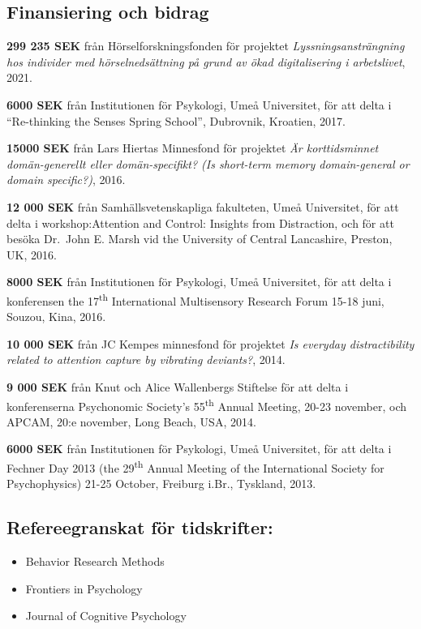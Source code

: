 \documentclass[]{article}
\begin{document}
\hypertarget{finansiering-och-bidrag}{%
\subsection{Finansiering och bidrag}\label{finansiering-och-bidrag}}

\textbf{299 235 SEK} från Hörselforskningsfonden för projektet
\emph{Lyssningsansträngning hos individer med hörselnedsättning på grund
av ökad digitalisering i arbetslivet}, 2021.

\textbf{6000 SEK} från Institutionen för Psykologi, Umeå Universitet,
för att delta i ``Re-thinking the Senses Spring School'', Dubrovnik,
Kroatien, 2017.

\textbf{15000 SEK} från Lars Hiertas Minnesfond för projektet \emph{Är
korttidsminnet domän-generellt eller domän-specifikt? (Is short-term
memory domain-general or domain specific?)}, 2016.

\textbf{12 000 SEK} från Samhällsvetenskapliga fakulteten, Umeå
Universitet, för att delta i workshop:Attention and Control: Insights
from Distraction, och för att besöka Dr.~John E. Marsh vid the
University of Central Lancashire, Preston, UK, 2016.

\textbf{8000 SEK} från Institutionen för Psykologi, Umeå Universitet,
för att delta i konferensen the 17\textsuperscript{th} International
Multisensory Research Forum 15-18 juni, Souzou, Kina, 2016.

\textbf{10 000 SEK} från JC Kempes minnesfond för projektet \emph{Is
everyday distractibility related to attention capture by vibrating
deviants?}, 2014.

\textbf{9 000 SEK} från Knut och Alice Wallenbergs Stiftelse för att
delta i konferenserna Psychonomic Society's 55\textsuperscript{th}
Annual Meeting, 20-23 november, och APCAM, 20:e november, Long Beach,
USA, 2014.

\textbf{6000 SEK} från Institutionen för Psykologi, Umeå Universitet,
för att delta i Fechner Day 2013 (the 29\textsuperscript{th} Annual
Meeting of the International Society for Psychophysics) 21-25 October,
Freiburg i.Br., Tyskland, 2013.

\hypertarget{refereegranskat-fuxf6r-tidskrifter}{%
\subsection{Refereegranskat för
tidskrifter:}\label{refereegranskat-fuxf6r-tidskrifter}}

\begin{itemize}
\item
  Behavior Research Methods
\item
  Frontiers in Psychology
\item
  Journal of Cognitive Psychology
\end{itemize}
\end{document}
